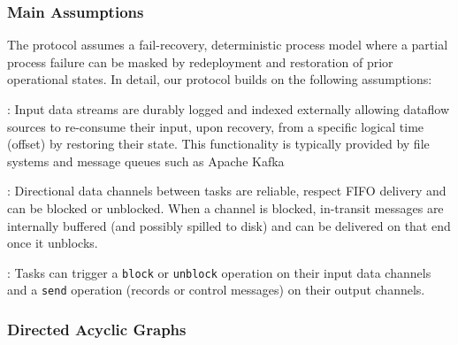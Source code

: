 \subsubsection{Main Assumptions}

The protocol assumes a fail-recovery, deterministic process model \cite{elnozahy2002survey} where a partial process failure can be masked by redeployment and restoration of prior operational states. In detail, our protocol builds on the following assumptions:

: Input data streams are durably logged and indexed externally allowing dataflow sources to re-consume their input, upon recovery, from a specific logical time (offset) by restoring their state. This functionality is typically provided by file systems and message queues such as Apache Kafka \cite{kreps2011kafka}

: Directional data channels between tasks are reliable, respect FIFO delivery and can be blocked or unblocked. When a channel is blocked, in-transit messages are internally buffered (and possibly spilled to disk) and can be delivered on that end once it unblocks.

: 
Tasks can trigger a \texttt{block} or \texttt{unblock} operation on their input data channels and a \texttt{send} operation (records or control messages) on their output channels.


\subsubsection{Directed Acyclic Graphs}


